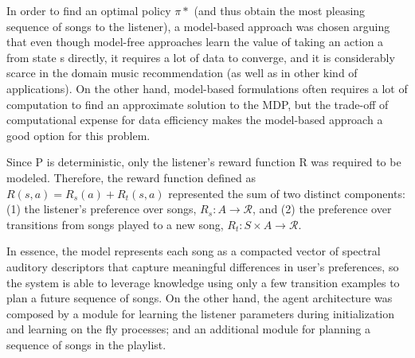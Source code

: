 In order to find an optimal policy $\pi*$ (and thus obtain the most pleasing sequence of songs to the listener), a model-based approach was chosen arguing that even though model-free approaches learn the value of taking an action a from state s directly, it requires a lot of data to converge, and it is considerably scarce in the domain music recommendation (as well as in other kind of applications). On the other hand, model-based formulations often requires a lot of computation to find an approximate solution to the MDP, but the trade-off of computational expense for data efficiency makes the model-based approach a good option for this problem.

Since P is deterministic, only the listener's reward function R was required to be modeled. Therefore, the reward function defined as $R(s, a) = R_s(a)+R_t(s, a)$ represented the sum of two distinct components: (1) the listener's preference over songs, $R_s : A \rightarrow \mathcal{R}$, and (2) the preference over transitions from songs played to a new song, $R_t : S \times A \rightarrow \mathcal{R}$.

In essence, the model represents each song as a compacted vector of spectral auditory descriptors that capture meaningful differences in user's preferences, so the system is able to leverage knowledge using only a few transition examples to plan a future sequence of songs. 
On the other hand, the agent architecture was composed by a module for learning the listener parameters 
during initialization and learning on the fly processes; and an additional module for planning a sequence of songs in the playlist. 

